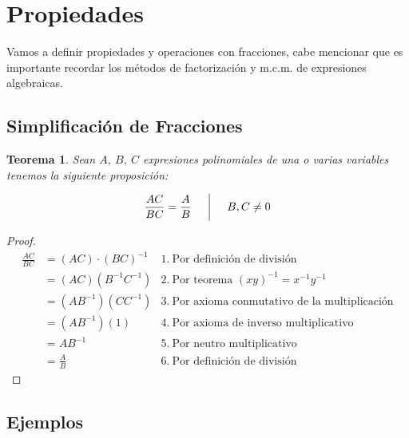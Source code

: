 \documentclass[letterpaper, 10pt, oneside]{book}
\newtheorem{theorem}{Teorema}[section]
\begin{document}
	\section{Propiedades}
	Vamos a definir propiedades y operaciones con fracciones, cabe mencionar que es importante recordar los métodos de factorización y m.c.m. de expresiones algebraicas. 
	
	\subsection{Simplificación de Fracciones}
	\vspace{5mm}
	
	\begin{theorem}
		Sean $A, \ B, \ C$ expresiones polinomiales de una o varias variables tenemos la siguiente proposición: 
		
		$$\frac{AC}{BC} = \frac{A}{B} \hspace{5mm} \bigg| \hspace{5mm} B, C \neq 0$$
		
	\end{theorem}
	
	\vspace{5mm}
	
	\begin{proof}
		\begin{align*}
			\frac{AC}{BC} &= (AC)\cdot(BC)^{-1} & 1. \ \text{Por definición de división}\\
			&=(AC)(B^{-1}C^{-1}) & 2. \ \text{Por teorema $(xy)^{-1} = x^{-1}y^{-1}$}\\
			&=(AB^{-1})(CC^{-1}) & 3. \ \text{Por axioma conmutativo de la multiplicación}\\
			&=(AB^{-1})(1) & 4. \ \text{Por axioma de inverso multiplicativo}\\
			&=AB^{-1} & 5. \ \text{Por neutro multiplicativo}\\
			&=\frac{A}{B} &6. \ \text{Por definición de división}
		\end{align*}
	\end{proof}
	
	\subsection*{Ejemplos}
	
\end{document}
